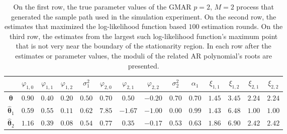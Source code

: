 \documentclass[nojss]{jss} %
\begin{document}
\begin{appendix}
\begin{table}[p]
\centering
\begin{tabular}{c c c c c c c c c c c c c c}
\hline
    & $\varphi_{1,0}$ & $\varphi_{1,1}$ & $\varphi_{1,2}$ & $\sigma_1^2$ & $\varphi_{2,0}$ & $\varphi_{2,1}$ & $\varphi_{2,2}$ & $\sigma_2^2$ & $\alpha_1$ & $\xi_{1,1}$ & $\xi_{1,2}$ & $\xi_{2,1}$ & $\xi_{2,2}$\\
\hline
$\boldsymbol{\theta}$ & $0.90$ & $0.40$ & $0.20$ & $0.50$ & $0.70$ & $0.50$ & $-0.20$ & $0.70$ & $0.70$ & $1.45$ & $3.45$ & $2.24$ & $2.24$ \\
$\hat{\boldsymbol{\theta}}_1$ & $0.59$ & $0.55$ & $0.11$ & $0.62$ & $7.85$ & $-1.67$ & $-1.00$ & $0.00$ & $0.99$ & $1.43$ & $6.48$ & $1.00$ & $1.00$ \\
$\hat{\boldsymbol{\theta}}_2$ & $1.16$ & $0.39$ & $0.08$ & $0.54$ & $0.77$ & $0.35$ & $-0.17$ & $0.53$ & $0.63$ & $1.86$ & $6.90$ & $2.42$ & $2.42$ \\
\hline
\end{tabular}
\caption{On the first row, the true parameter values of the GMAR $p=2$, $M=2$ process that generated the sample path used in the simulation experiment. On the second row, the estimates that maximized the log-likelihood function based $100$ estimation rounds. On the third row, the estimates from the largest such log-likelihood function's maximum point that is not very near the boundary of the stationarity region. In each row after the estimates or parameter values, the moduli of the related AR polynomial's roots are presented.}
\label{tab:simuexp}
\end{table}


\end{appendix}
\end{document}
